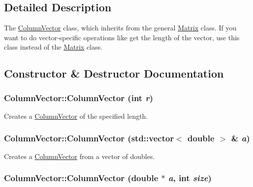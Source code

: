 \subsection{Detailed Description}
The \hyperlink{class_column_vector}{ColumnVector} class, which inherits from the general \hyperlink{class_matrix}{Matrix} class. If you want to do vector-\/specific operations like get the length of the vector, use this class instead of the \hyperlink{class_matrix}{Matrix} class. 

\subsection{Constructor \& Destructor Documentation}
\hypertarget{class_column_vector_a080508988b684290b2a0123a923a1e08}{
\subsubsection[{ColumnVector}]{\setlength{\rightskip}{0pt plus 5cm}ColumnVector::ColumnVector (int {\em r})}}
\label{class_column_vector_a080508988b684290b2a0123a923a1e08}


Creates a \hyperlink{class_column_vector}{ColumnVector} of the specified length. 

\hypertarget{class_column_vector_a51a68a454f01918fd4bc1736ac0d4264}{
\subsubsection[{ColumnVector}]{\setlength{\rightskip}{0pt plus 5cm}ColumnVector::ColumnVector (std::vector$<$ double $>$ \& {\em a})}}
\label{class_column_vector_a51a68a454f01918fd4bc1736ac0d4264}


Creates a \hyperlink{class_column_vector}{ColumnVector} from a vector of doubles. 

\hypertarget{class_column_vector_aa0b9560305d34dd819e7913a811f3336}{
\subsubsection[{ColumnVector}]{\setlength{\rightskip}{0pt plus 5cm}ColumnVector::ColumnVector (double $\ast$ {\em a}, \/  int {\em size})}}
\label{class_column_vector_aa0b9560305d34dd819e7913a811f3336}


